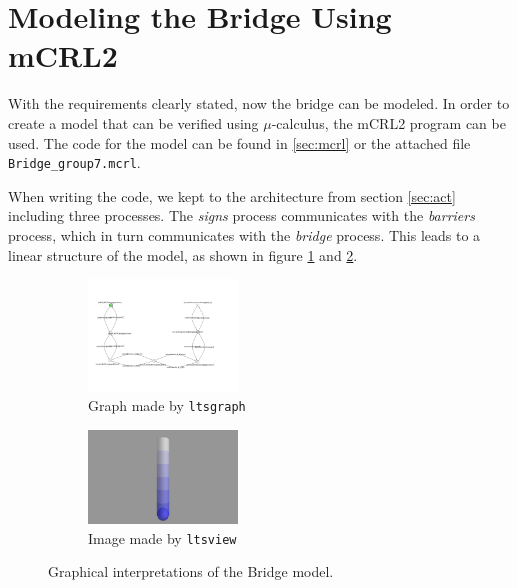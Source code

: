 \section{Modeling the Bridge Using mCRL2}

With the requirements clearly stated, now the bridge can be modeled. In order to create a model that can be verified using $\mu$-calculus, the mCRL2 program can be used. The code for the model can be found in \ref{sec:mcrl} or the attached file \texttt{Bridge\_group7.mcrl}.

When writing the code, we kept to the architecture from section \ref{sec:act} including three processes. The \emph{signs} process communicates with the \emph{barriers} process, which in turn communicates with the \emph{bridge} process. This leads to a linear structure of the model, as shown in figure \ref{fig:graph} and \ref{fig:view}.
%
\begin{figure}[htb]
\centering
		\begin{subfigure} [h] {0.3\textwidth}
		\centering
		\includegraphics[width=150px]{Images/Bridge_ltsgraph.png}
		\caption{Graph made by \texttt{ltsgraph}}
		\label{fig:graph}
	\end{subfigure}
\hspace{5em}
	\begin{subfigure} [h] {0.3\textwidth}
		\centering
		\includegraphics[width=150px]{Images/Bridge_ltsview.jpg}
		\caption{Image made by \texttt{ltsview}}
		\label{fig:view}
	\end{subfigure}
\caption{Graphical interpretations of the Bridge model.}%
\label{}%
\end{figure}%
%